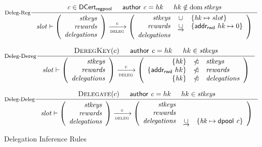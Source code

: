 \begin{figure}
  \centering
  \begin{equation}\label{eq:deleg-reg}
    \inference[Deleg-Reg]
    {
      \var{c}\in\DCertRegPool & \cauthor{c} = hk & hk \notin \dom \var{stkeys}
    }
    {
      \var{slot} \vdash
      \left(
      \begin{array}{r}
        \var{stkeys} \\
        \var{rewards} \\
        \var{delegations}
      \end{array}
      \right)
      \trans{deleg}{\var{c}}
      \left(
      \begin{array}{rcl}
        \var{stkeys} & \union & \{\var{hk} \mapsto slot\}\\
        \var{rewards} & \unionoverrideRight & \{\addrRw \var{hk} \mapsto 0\}\\
        \var{delegations}
      \end{array}
      \right)
    }
  \end{equation}

  \begin{equation}\label{eq:deleg-dereg}
    \inference[Deleg-Dereg]
    {
      \DeregKey{c} & \cauthor{c} = hk & hk \in \var{stkeys}
    }
    {
      \var{slot} \vdash
      \left(
      \begin{array}{r}
        \var{stkeys} \\
        \var{rewards} \\
        \var{delegations}
      \end{array}
      \right)
      \trans{deleg}{\var{c}}
      \left(
      \begin{array}{rcl}
        \{\var{hk}\} & \subtractdom & \var{stkeys}\\
        \{\addrRw \var{hk}\} & \subtractdom & \var{rewards} \\
        \{\var{hk}\} & \subtractdom & \var{delegations}
      \end{array}
      \right)
    }
  \end{equation}

  \begin{equation}\label{eq:deleg-deleg}
    \inference[Deleg-Deleg]
    {
      \Delegate{c} & \cauthor{c} = hk & hk \in \var{stkeys}
    }
    {
      \var{slot} \vdash
      \left(
      \begin{array}{r}
        \var{stkeys} \\
        \var{rewards} \\
        \var{delegations}
      \end{array}
      \right)
      \trans{deleg}{c}
      \left(
      \begin{array}{rcl}
        \var{stkeys} \\
        \var{rewards} \\
        \var{delegations} & \unionoverrideRight & \{\var{hk} \mapsto \dpool c\}
      \end{array}
      \right)
    }
  \end{equation}
  \caption{Delegation Inference Rules}
  \label{fig:delegation-rules}
\end{figure}



